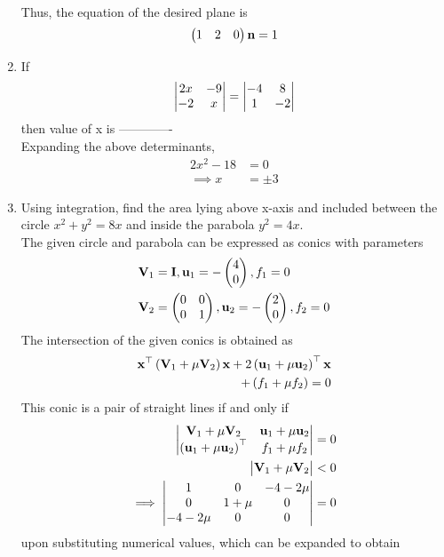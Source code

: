 \documentclass[journal,12pt,twocolumn]{IEEEtran}
\renewcommand\thesection{\arabic{section}}
\begin{document}
\begin{enumerate}[label=\thesection.\arabic*.,ref=\thesection.\theenumi]
\begin{align}
  \end{align}
  Thus, the equation of the desired plane is 
\begin{align}
\begin{pmatrix}1 & 2 & 0\end{pmatrix} \mathbf{n} = 1
  \end{align}
\item  If \begin{align} \begin{vmatrix}2x & -9 \\ -2 & x\end{vmatrix}  = \begin{vmatrix}-4 & 8 \\ 1 & -2 \end{vmatrix} \nonumber \end{align} then value of x is -------------\\
\solution
		Expanding the above determinants,
\begin{align}
	2x^2 - 18 &= 0
	\\
	\implies x &= \pm 3
\end{align}
 \item Using integration, find the area lying above x-axis and included between the circle $ x^2 + y^2 =8x $ and inside the parabola $ y^2 =4x $.   
	 \\
	 \solution The given circle and parabola can be expressed as conics with parameters
\begin{align}
	\mathbf{V}_1 &= \mathbf{I}, \mathbf{u}_1 = -\begin{pmatrix}4 \\0\end{pmatrix}, f_1 = 0
	\\
	\mathbf{V}_2 &= \begin{pmatrix} 0 & 0 \\ 0 & 1\end{pmatrix}, \mathbf{u}_2 = -\begin{pmatrix}2 \\0\end{pmatrix}, f_2 = 0
    \end{align}
    The intersection of the given conics is obtained as 
\begin{align}
	\mathbf{x}^{\top}\left(\mathbf{V}_1 + \mu\mathbf{V}_2\right)\mathbf{x}+2 \left(\mathbf{u}_1+\mu \mathbf{u}_2\right)^{\top} \mathbf{x} 
	\\
	+ \left(f_1+\mu f_2\right)= 0
    \end{align}
    This conic is a pair of straight lines if  and only if 
\begin{align}
	\begin{vmatrix}\mathbf{V}_1 + \mu\mathbf{V}_2 & \mathbf{u}_1+\mu \mathbf{u}_2\\ \left(\mathbf{u}_1+\mu \mathbf{u}_2\right)^{\top} & f_1 + \mu f_2\end{vmatrix} &= 0
	\\
	\label{eq:conic-pair}
	\begin{vmatrix}\mathbf{V}_1 + \mu\mathbf{V}_2\end{vmatrix} &< 0
\\
	\implies 	\begin{vmatrix}1 & 0 & -4-2\mu\\ 0 & 1+\mu & 0 \\ -4 - 2\mu & 0 & 0\end{vmatrix} &= 0
    \end{align}
    upon substituting numerical values, which can be expanded to obtain 

\end{enumerate}
\end{document}
